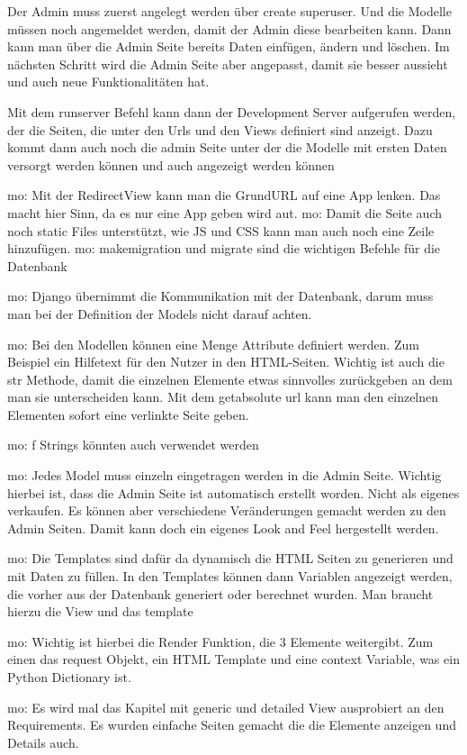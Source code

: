 \documentclass[11pt,a4paper]{report}
\begin{document}
Der Admin muss zuerst angelegt werden über create superuser.
Und die Modelle müssen noch angemeldet werden, damit der Admin diese bearbeiten kann. Dann kann man über die Admin Seite bereits Daten einfügen, ändern und löschen. Im nächsten Schritt wird die Admin Seite aber angepasst, damit sie besser aussieht und auch neue Funktionalitäten hat. 

Mit dem runserver Befehl kann dann der Development Server aufgerufen werden, der die Seiten, die unter den Urls und den Views definiert sind anzeigt. Dazu kommt dann auch noch die admin Seite unter der die Modelle mit ersten Daten versorgt werden können und auch angezeigt werden können

mo: Mit der RedirectView kann man die GrundURL auf eine App lenken. Das macht hier Sinn, da es nur eine App geben wird aut.
mo: Damit die Seite auch noch static Files unterstützt, wie JS und CSS kann man auch noch eine Zeile hinzufügen.
mo: makemigration und migrate sind die wichtigen Befehle für die Datenbank 

mo: Django übernimmt die Kommunikation mit der Datenbank, darum muss man bei der Definition der Models nicht darauf achten.

mo: Bei den Modellen können eine Menge Attribute definiert werden. Zum Beispiel ein Hilfetext für den Nutzer in den HTML-Seiten. Wichtig ist auch die str Methode, damit die einzelnen Elemente etwas sinnvolles zurückgeben an dem man sie unterscheiden kann. Mit dem getabsolute url kann man den einzelnen Elementen sofort eine verlinkte Seite geben.

mo: f Strings könnten auch verwendet werden

mo: Jedes Model muss einzeln eingetragen werden in die Admin Seite. Wichtig hierbei ist, dass die Admin Seite ist automatisch erstellt worden. Nicht als eigenes verkaufen. Es können aber verschiedene Veränderungen gemacht werden zu den Admin Seiten. Damit kann doch ein eigenes Look and Feel hergestellt werden. 

mo: Die Templates sind dafür da dynamisch die HTML Seiten zu generieren und mit Daten zu füllen. In den Templates können dann Variablen angezeigt werden, die vorher aus der Datenbank generiert oder berechnet wurden. Man braucht hierzu die View und das template

mo: Wichtig ist hierbei die Render Funktion, die 3 Elemente weitergibt. Zum einen das request Objekt, ein HTML Template und eine context Variable, was ein Python Dictionary ist. 

mo: Es wird mal das Kapitel mit generic und detailed View ausprobiert an den Requirements. Es wurden einfache Seiten gemacht die die Elemente anzeigen und Details auch.
\end{document}
